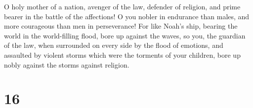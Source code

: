  O holy mother of a nation, avenger of the law, defender
of religion, and prime bearer in the battle of the affections!
 O you nobler in endurance than males, and more
courageous than men in perseverance!  For like Noah's
ship, bearing the world in the world-filling flood, bore up against the
waves,  so you, the guardian of the law, when surrounded
on every side by the flood of emotions, and assaulted by violent storms
which were the torments of your children, bore up nobly against the
storms against religion.

\hypertarget{section-15}{%
\section{16}\label{section-15}}

